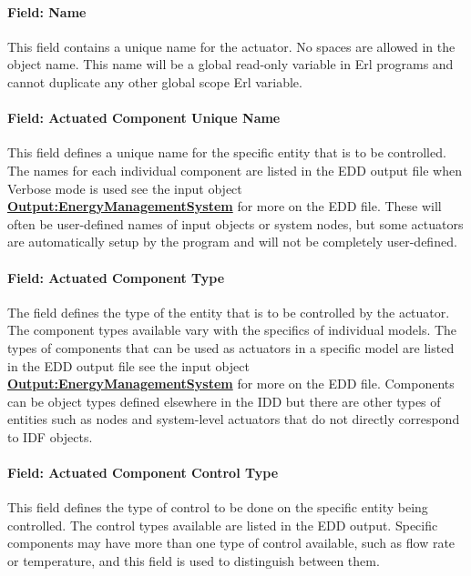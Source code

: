 \paragraph{Field: Name}\label{field-name-2-014}

This field contains a unique name for the actuator. No spaces are allowed in the object name. This name will be a global read-only variable in Erl programs and cannot duplicate any other global scope Erl variable.

\paragraph{Field: Actuated Component Unique Name}\label{field-actuated-component-unique-name-000}

This field defines a unique name for the specific entity that is to be controlled. The names for each individual component are listed in the EDD output file when Verbose mode is used see the input object \textbf{\hyperref[outputenergymanagementsystem]{Output:EnergyManagementSystem}} for more on the EDD file. These will often be user-defined names of input objects or system nodes, but some actuators are automatically setup by the program and will not be completely user-defined.

\paragraph{Field: Actuated Component Type}\label{field-actuated-component-type-000}

The field defines the type of the entity that is to be controlled by the actuator. The component types available vary with the specifics of individual models. The types of components that can be used as actuators in a specific model are listed in the EDD output file see the input object \textbf{\hyperref[outputenergymanagementsystem]{Output:EnergyManagementSystem}} for more on the EDD file. Components can be object types defined elsewhere in the IDD but there are other types of entities such as nodes and system-level actuators that do not directly correspond to IDF objects.

\paragraph{Field: Actuated Component Control Type}\label{field-actuated-component-control-type-000}

This field defines the type of control to be done on the specific entity being controlled. The control types available are listed in the EDD output. Specific components may have more than one type of control available, such as flow rate or temperature, and this field is used to distinguish between them.


